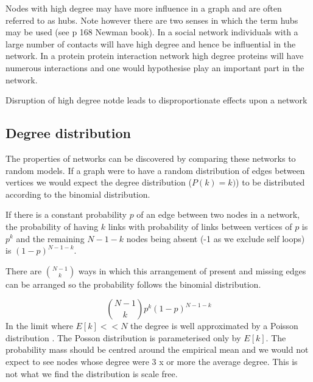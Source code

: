  Nodes with high degree may have more influence in a graph and are often referred to as hubs. Note however there are two senses in which the term hubs may be used (see p 168 Newman book\cite{newman2018networks}).  In a social network  individuals with a large number of contacts will have high degree and hence be influential in the network. In a protein protein interaction network high degree proteins will have numerous interactions and one would hypothesise play an important part in the network. 
 
 Disruption of high degree notde leads to disproportionate effects upon a network \cite{jeong2001lethality} 

\subsection{Degree distribution}
\label{sec:degree distribution}
The properties of networks can be discovered by comparing these networks to random models. 
If a graph were to have a random distribution of edges between vertices we would expect the degree distribution ($P(k)=k)$) to be distributed according to the binomial distribution.  

If there is a constant probability $p$ of an edge between two nodes in a network, the probability of having $k$ links with probability of links between vertices of $p$ is $p^k$ and the remaining $N-1-k$ nodes being absent (-1 as we exclude self loops) is $(1-p)^{N-1-k}$.

There are $\binom{N-1}{k}$ ways in which this arrangement of present and missing edges can be arranged so the probability follows the binomial distribution.

\begin{equation}
   \binom{N-1}{k}        p^k (1-p)^{N-1-k}
   \label{Equation:BinomialDistributionForDegreeProbability}
\end{equation}
In the limit where $E[k] << N$ the degree is well approximated by a Poisson distribution \cite{barabasi2016network}. The Posson distribution is parameterised only by $E[k]$.  The probability mass should be centred around the empirical mean and we would not expect to see nodes whose degree were 3 x or more the average degree. This is not what we find the distribution is scale free.  


